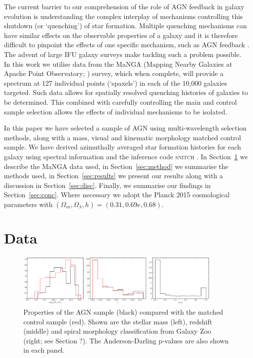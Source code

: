 \documentclass[useAMS,usenatbib]{mn2e}
\begin{document}
The current barrier to our comprehension of the role of AGN feedback in galaxy evolution is understanding the complex interplay of mechanisms controlling this shutdown (or `quenching') of star formation. Multiple quenching mechanisms can have similar effects on the observable properties of a galaxy and it is therefore difficult to pinpoint the effects of one specific mechanism, such as AGN feedback \cite{smethurst17}. The advent of large IFU galaxy surveys make tackling such a problem possible. In this work we utilise data from the MaNGA (Mapping Nearby Galaxies at Apache Point Observatory; \citealt{Bundy15}) survey, which when complete, will provide a spectrum at 127 individual points (`spaxels') in each of the 10,000 galaxies targeted. Such data allows for spatially resolved quenching histories of galaxies to be determined. This combined with carefully controlling the main and control sample selection allows the effects of individual mechanisms to be isolated. 

In this paper we have selected a sample of AGN using multi-wavelength selection methods, along with a mass, visual and kinematic morphology matched control sample. We have derived azimuthally averaged star formation histories for each galaxy using spectral information and the inference code \textsc{snitch} \cite{smethurst19a}. In Section~\ref{sec:data} we describe the MaNGA data used, in Section~\ref{sec:method} we summarise the methods used, in Section~\ref{sec:results} we present our results along with a discussion in Section~\ref{sec:disc}. Finally, we summarise our findings in Section~\ref{sec:conc}. Where necessary we adopt the Planck 2015 \citep{planck16} cosmological parameters with $(\Omega_m, \Omega_{\lambda}, h) = (0.31, 0.69e, 0.68)$. 

\section{Data}\label{sec:data}

\begin{figure}
\includegraphics[width=0.9\textwidth]{../data/ellison/figures/control_manga_agn_properties_compare.png}
\caption{Properties of the AGN sample (black) compared with the matched control sample (red). Shown are the stellar mass (left), redshift (middle) and spiral morphology classification from Galaxy Zoo (right; see Section ?). The Anderson-Darling p-values are also shown in each panel.}
\end{figure}
\end{document}
